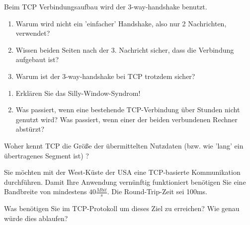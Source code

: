 
Beim TCP Verbindungsaufbau wird der 3-way-handshake benutzt.
\begin{enumerate}
    \item Warum wird nicht ein 'einfacher' Handshake, also nur 2 Nachrichten, verwendet?
    \item Wissen beiden Seiten nach der 3. Nachricht sicher, dass die Verbindung aufgebaut ist?
    \item Warum ist der 3-way-handshake bei TCP trotzdem sicher?
\end{enumerate}

\begin{enumerate}
    \item Erklären Sie das Silly-Window-Syndrom!
    \item Was passiert, wenn eine bestehende TCP-Verbindung über Stunden nicht genutzt wird? Was passiert, wenn einer der beiden verbundenen Rechner abstürzt?
\end{enumerate}

Woher kennt TCP die Größe der übermittelten Nutzdaten (bzw. wie 'lang' ein übertragenes Segment ist) ?

Sie möchten mit der West-Küste der USA eine TCP-basierte Kommunikation durchführen. Damit Ihre Anwendung vernünftig funktioniert benötigen Sie eine Bandbreite von mindestens $40 \frac{Mbit}{s}$. Die Round-Trip-Zeit sei 100ms.

Was benötigen Sie im TCP-Protokoll um dieses Ziel zu erreichen? Wie genau würde dies ablaufen?